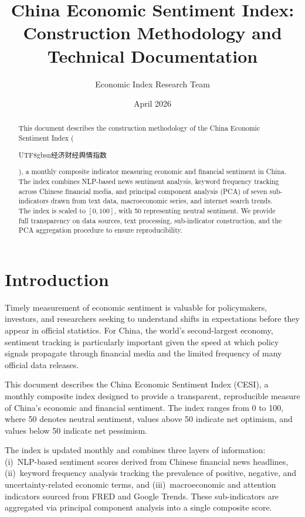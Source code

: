 \documentclass[11pt]{article}
\title{China Economic Sentiment Index:\\
Construction Methodology and Technical Documentation}
\author{Economic Index Research Team}
\date{April 2026}
\begin{document}
\maketitle

\begin{abstract}
\noindent
This document describes the construction methodology of the China
Economic Sentiment Index
(\begin{CJK}{UTF8}{gbsn}经济财经舆情指数\end{CJK}),
a monthly composite indicator measuring economic and financial
sentiment in China.  The index combines NLP-based news sentiment
analysis, keyword frequency tracking across Chinese financial media,
and principal component analysis (PCA) of seven sub-indicators drawn
from text data, macroeconomic series, and internet search trends.  The
index is scaled to $[0,100]$, with 50 representing neutral sentiment.
We provide full transparency on data sources, text processing,
sub-indicator construction, and the PCA aggregation procedure to
ensure reproducibility.
\end{abstract}

\section{Introduction}\label{sec:intro}

Timely measurement of economic sentiment is valuable for
policymakers, investors, and researchers seeking to understand shifts
in expectations before they appear in official statistics.  For China,
the world's second-largest economy, sentiment tracking is particularly
important given the speed at which policy signals propagate through
financial media and the limited frequency of many official data
releases.

This document describes the China Economic Sentiment Index (CESI), a
monthly composite index designed to provide a transparent, reproducible
measure of China's economic and financial sentiment.  The index
ranges from 0 to 100, where 50 denotes neutral sentiment, values
above 50 indicate net optimism, and values below 50 indicate net
pessimism.

The index is updated monthly and combines three layers of information:
(i)~NLP-based sentiment scores derived from Chinese financial news
headlines, (ii)~keyword frequency analysis tracking the prevalence of
positive, negative, and uncertainty-related economic terms, and
(iii)~macroeconomic and attention indicators sourced from FRED and
Google Trends.  These sub-indicators are aggregated via principal
component analysis into a single composite score.
\end{document}
